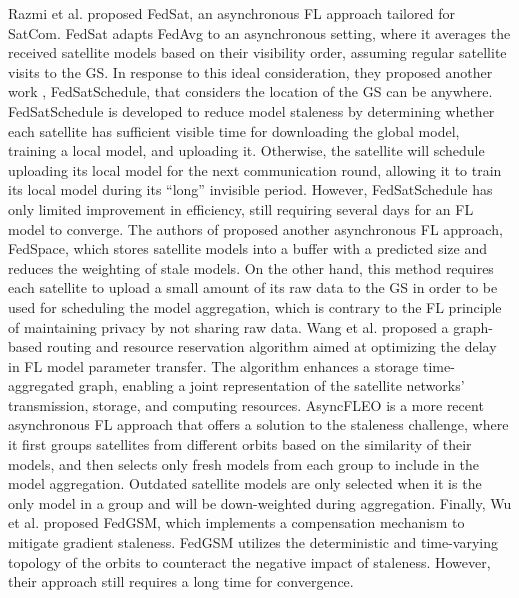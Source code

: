 \documentclass[letter,journal]{IEEEtran}
\begin{document}
Razmi et al. \cite{razmi2022ground} proposed FedSat, an asynchronous FL approach tailored for SatCom. FedSat adapts FedAvg \cite{mcmahan2017communication} to an asynchronous setting, where it averages the received satellite models based on their visibility order, assuming regular satellite visits to the GS. In response to this ideal consideration, they proposed another work \cite{razmi2022scheduling}, FedSatSchedule, that considers the location of the GS can be anywhere. FedSatSchedule is developed to reduce model staleness by determining whether each satellite has sufficient visible time for downloading the global model, training a local model, and uploading it. Otherwise, the satellite will schedule uploading its local model for the next communication round, allowing it to train its local model during its ``long'' invisible period. However, FedSatSchedule has only limited improvement in efficiency, still requiring several days for an FL model to converge. The authors of \cite{so2022fedspace} proposed another asynchronous FL approach, FedSpace, which stores satellite models into a buffer with a predicted size and reduces the weighting of stale models.  On the other hand, this method requires each satellite to upload a small amount of its raw data to the GS in order to be used for scheduling the model aggregation, which is contrary to the FL principle of maintaining privacy by not sharing raw data. Wang et al. \cite{wang2022fl} proposed a graph-based routing and resource reservation algorithm aimed at optimizing the delay in FL model parameter transfer. The algorithm enhances a storage time-aggregated graph, enabling a joint representation of the satellite networks' transmission, storage, and computing resources. AsyncFLEO \cite{mAsyFLEO} is a more recent asynchronous FL approach that offers a solution to the staleness challenge, where it first groups satellites from different orbits based on the similarity of their models, and then selects only fresh models from each group to include in the model aggregation. Outdated satellite models are only selected when it is the only model in a group and will be down-weighted during aggregation. Finally, Wu et al. \cite{wu2023fedgsm} proposed FedGSM, which implements a compensation mechanism to mitigate gradient staleness. FedGSM utilizes the deterministic and time-varying topology of the orbits to counteract the negative impact of staleness. However, their approach still requires a long time for convergence.
\end{document}
